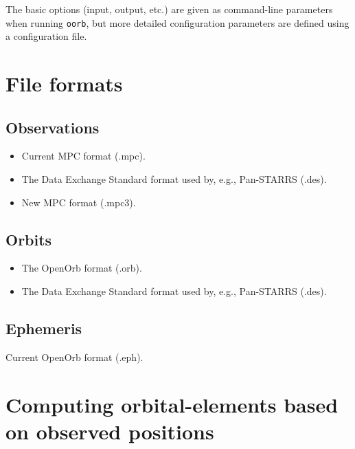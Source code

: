 \documentclass[12pt,english,twoside,a4paper]{report}
\begin{document}
The basic options (input, output, etc.) are given as command-line
parameters when running \verb|oorb|, but more detailed configuration
parameters are defined using a configuration file.

\section{File formats}

\subsection{Observations}

\begin{itemize}

\item Current MPC format (.mpc).
\item The Data Exchange Standard format used by, e.g., Pan-STARRS (.des).
\item New MPC format (.mpc3).

\end{itemize}

\subsection{Orbits}

\begin{itemize}

\item The OpenOrb format (.orb).
\item The Data Exchange Standard format used by, e.g., Pan-STARRS (.des).

\end{itemize}

\subsection{Ephemeris}

Current OpenOrb format (.eph).



\section{Computing orbital-elements based on observed positions}
\end{document}
